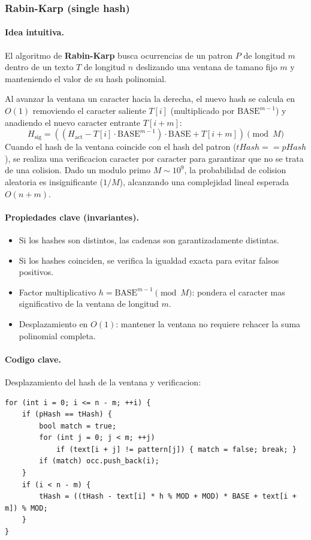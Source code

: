 \subsubsection{Rabin-Karp (single hash)}

\paragraph{Idea intuitiva.}
El algoritmo de \textbf{Rabin-Karp} busca ocurrencias de un patron $P$ de longitud $m$ dentro de un texto $T$ de longitud $n$ deslizando una ventana de tamano fijo $m$ y manteniendo el valor de su hash polinomial. 

Al avanzar la ventana un caracter hacia la derecha, el nuevo hash se calcula en $O(1)$ removiendo el caracter saliente $T[i]$ (multiplicado por $\text{BASE}^{m-1}$) y anadiendo el nuevo caracter entrante $T[i+m]$:
\[
H_{\text{sig}} = \left( (H_{\text{act}} - T[i] \cdot \text{BASE}^{m-1}) \cdot \text{BASE} + T[i+m] \right) \pmod M
\]
Cuando el hash de la ventana coincide con el hash del patron ($tHash == pHash$), se realiza una verificacion caracter por caracter para garantizar que no se trata de una colision. Dado un modulo primo $M \sim 10^9$, la probabilidad de colision aleatoria es insignificante ($1/M$), alcanzando una complejidad lineal esperada $O(n + m)$.

\paragraph{Propiedades clave (invariantes).}
\begin{itemize}\setlength\itemsep{0pt}
	\item Si los hashes son distintos, las cadenas son garantizadamente distintas.
	\item Si los hashes coinciden, se verifica la igualdad exacta para evitar falsos positivos.
	\item Factor multiplicativo $h = \text{BASE}^{m-1} \pmod M$: pondera el caracter mas significativo de la ventana de longitud $m$.
	\item Desplazamiento en $O(1)$: mantener la ventana no requiere rehacer la suma polinomial completa.
\end{itemize}

\paragraph{Codigo clave.}
Desplazamiento del hash de la ventana y verificacion:
\begin{verbatim}
for (int i = 0; i <= n - m; ++i) {
    if (pHash == tHash) {
        bool match = true;
        for (int j = 0; j < m; ++j)
            if (text[i + j] != pattern[j]) { match = false; break; }
        if (match) occ.push_back(i);
    }
    if (i < n - m) {
        tHash = ((tHash - text[i] * h % MOD + MOD) * BASE + text[i + m]) % MOD;
    }
}
\end{verbatim}

